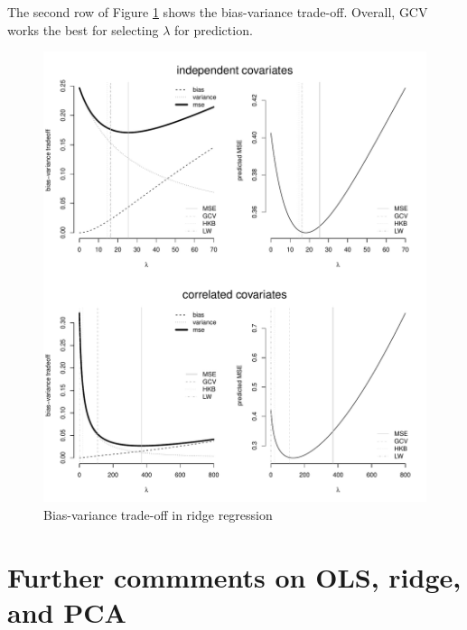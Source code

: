 The second row of Figure \ref{fig::bias-variance-tradeoff-ridge} shows the bias-variance trade-off. Overall, GCV works the best for selecting $\lambda$ for prediction. 

\begin{figure} 
\centering 
\includegraphics[width = \textwidth]{figures/biasvariancetradeoffridgeplot}
\caption{Bias-variance trade-off in ridge regression}\label{fig::bias-variance-tradeoff-ridge}
\end{figure}




\section{Further commments on OLS, ridge, and PCA}


